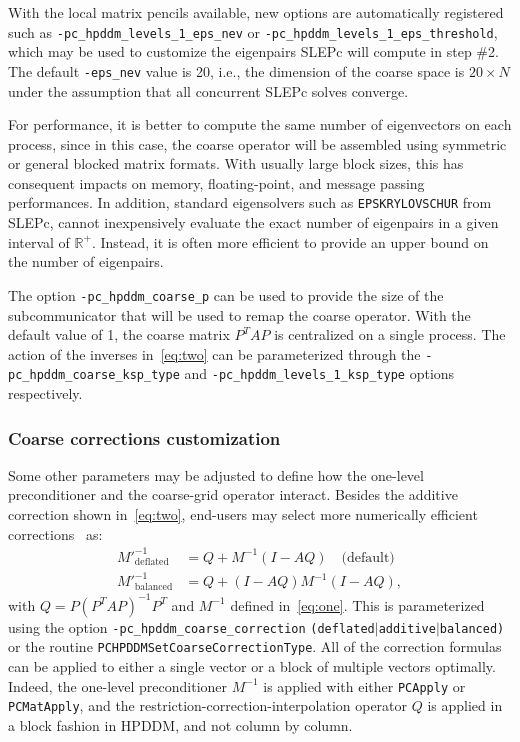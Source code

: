 \documentclass[3p,11pt]{elsarticle}
\newcommand{\pk}[1]{\texttt{#1}}
\begin{document}
With the local
matrix pencils available, new options are automatically registered such as
\pk{-pc\_hpddm\_levels\_1\_eps\_nev} or \pk{-pc\_hpddm\_levels\_1\_eps\_threshold}, which
may be used to customize the eigenpairs SLEPc will compute in step \#2. The
default \pk{-eps\_nev} value is 20, i.e., the dimension of the coarse space is
$20\times N$ under the assumption that all concurrent SLEPc solves converge.

For performance, it is better to compute the same number of
eigenvectors on each process, since in this case, the coarse operator will be
assembled using symmetric or general blocked matrix formats. With
usually large block sizes, this has consequent impacts on memory, floating-point, and message passing performances.
In addition,
standard eigensolvers such as \pk{EPSKRYLOVSCHUR} from SLEPc, cannot inexpensively
evaluate the exact number of eigenpairs in a given interval of $\mathbb{R}^+$.
Instead, it is often more efficient to provide an upper bound on the number of
eigenpairs.

The option \pk{-pc\_hpddm\_coarse\_p} can be used to provide the size of the
subcommunicator that will be used to remap the coarse operator. With the default
value of 1, the coarse matrix $P^TAP$ is centralized on a single process.
The action of the inverses in~\cref{eq:two} can be parameterized through the
\pk{-pc\_hpddm\_coarse\_ksp\_type} and \pk{-pc\_hpddm\_levels\_1\_ksp\_type} options
respectively.

    \subsubsection{Coarse corrections customization}
Some other parameters may be adjusted to define how the one-level preconditioner
and the coarse-grid operator interact. Besides the additive
correction shown in~\cref{eq:two}, end-users may select more numerically efficient
corrections~\cite{tang2009comparison,bastian1998additive} as:
\begin{align*}
    M'^{-1}_{\text{deflated}} &= Q + M^{-1}\left(I - AQ\right)\quad
    \text{(default)}\\
    M'^{-1}_{\text{balanced}} &= Q + \left(I - AQ\right)M^{-1}\left(I - AQ\right),
\end{align*}
with $Q = P \left(P^T A P\right)^{-1} P^T$ and $M^{-1}$ defined in~\cref{eq:one}. This is parameterized using the
option \pk{-pc\_hpddm\_coarse\_correction}
\pk{(deflated$|$additive$|$balanced)} or the routine
\pk{PCHPDDMSetCoarseCorrectionType}. All of
the correction formulas can be applied to either a single vector or a block
of multiple vectors optimally. Indeed, the one-level preconditioner $M^{-1}$ is
applied with either \pk{PCApply} or \pk{PCMatApply}, and the
restriction-correction-interpolation operator $Q$ is applied in a block fashion
in HPDDM, and not column by column. %
\end{document}
